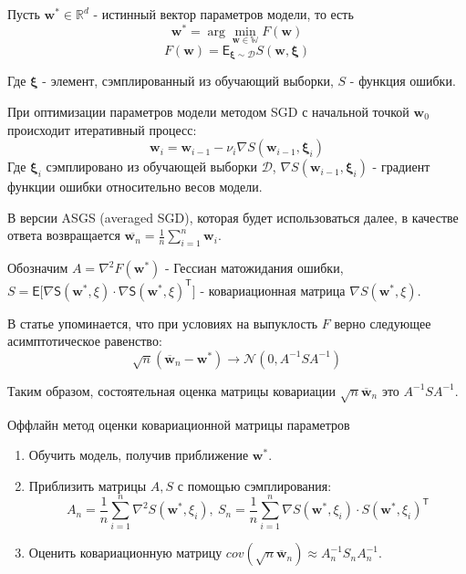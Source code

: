 \documentclass[12pt, twoside]{article}
\begin{document}
Пусть $\mathbf{w}^* \in \mathbb{R}^d$ - истинный вектор параметров модели, то есть
$$
\mathbf{w}^* = \arg \min\limits_{\mathbf{w} \in \mathbb{W}} F(\mathbf{w})
$$
$$
F(\mathbf{w}) = \mathsf{E}_{\mathbf{\xi} \sim \mathcal{D}}S(\mathbf{w}, \mathbf{\xi})
$$

Где $\mathbf{\xi}$ - элемент, сэмплированный из обучающий выборки, $S$ - функция ошибки.

При оптимизации параметров модели методом SGD с начальной точкой $\mathbf{w}_0$ происходит итеративный процесс:
$$
\mathbf{w}_i = \mathbf{w}_{i-1} - \nu_i\nabla S(\mathbf{w}_{i-1}, \mathbf{\xi}_i)
$$
Где $\mathbf{\xi}_i$ сэмплировано из обучающей выборки $\mathcal{D}$, $\nabla S(\mathbf{w}_{i-1}, \mathbf{\xi}_i)$ - градиент функции ошибки относительно весов модели. 

В версии ASGS (averaged SGD), которая будет использоваться далее, в качестве ответа возвращается $\overline{\mathbf{w}_n} = \frac{1}{n}\sum\limits_{i=1}^n\mathbf{w}_i$.

Обозначим $A=\nabla^2F(\mathbf{w}^*)$ - Гессиан матожидания ошибки, $S=\mathsf{E\big[\nabla S(\mathbf{w}^*, \xi) \cdot \nabla S(\mathbf{w}^*, \xi)^{\mathsf{T}}\big]}$ - ковариационная матрица $\nabla S(\mathbf{w}^*, \xi)$.

В статье упоминается, что при условиях на выпуклость $F$ верно следующее асимптотическое равенство:
$$
\sqrt{n}(\overline{\mathbf{w}}_n - \mathbf{w}^*) \to \mathcal{N}(0, A^{-1}SA^{-1})
$$

Таким образом, состоятельная оценка матрицы ковариации $\sqrt{n}\overline{\mathbf{w}}_n$ это $A^{-1}SA^{-1}$.

\begin{algorithm}[H] 
         \caption{Оффлайн метод оценки ковариационной матрицы параметров}\label{alg:offline_cov} 
         \begin{enumerate}
             \item Обучить модель, получив приближение $\mathbf{w}^*$.
             \item Приблизить матрицы $A, S$ с помощью сэмплирования:
             $$
             A_n = \frac{1}{n}\sum\limits_{i=1}^n\nabla^2S(\mathbf{w}^*, \xi_i), \ 
             S_n = \frac{1}{n}\sum\limits_{i=1}^n\nabla S(\mathbf{w}^*, \xi_i) \cdot S(\mathbf{w}^*, \xi_i)^{\mathsf{T}}
             $$
             \item Оценить ковариационную матрицу $cov(\sqrt{n}\overline{\mathbf{w}}_n) \approx A_n^{-1}S_nA_n^{-1}$.
         \end{enumerate}
 \end{algorithm}
\end{document}
